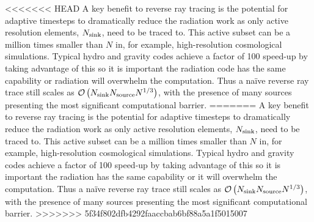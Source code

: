 \documentclass[fleq,usenatbib]{mnras}
\newcommand{\bigO}[1]{\mathcal{O}\left(#1\right)}
\newcommand{\NS}{N_{\rm source}}
\newcommand{\NK}{N_{\rm sink}}
\begin{document}
<<<<<<< HEAD
A key benefit to reverse ray tracing is the potential for adaptive timesteps 
to dramatically reduce the radiation work as only active resolution elements, 
$\NK$, need to be traced to. This active subset can be a million times smaller 
than $N$ in, for example, high-resolution cosmological simulations. Typical 
hydro and gravity codes achieve a factor of 100 speed-up by taking advantage 
of this so it is important the radiation code has the same capability or 
radiation will overwhelm the computation. Thus a na\"ive reverse ray trace 
still scales as $\bigO{\NK \NS N^{1/3}}$, with the presence of many sources 
presenting the most significant computational barrier.
=======
A key benefit to reverse ray tracing is the potential for adaptive timesteps to dramatically 
reduce the radiation work as only active resolution elements, $\NK$, need 
to be traced to. This active subset can be a million times smaller than 
$N$ in, for example, high-resolution cosmological simulations.
Typical hydro and gravity codes achieve a factor of 100 speed-up by taking advantage of this
so it is important the radiation has the same capability or it will overwhelm the computation.
Thus a na\"ive reverse 
ray trace still scales as $\bigO{\NK \NS N^{1/3}}$, with the presence of many 
sources presenting the most significant computational barrier.
>>>>>>> 5f34f802dfb4292faaccbab6bf88a5a1f5015007
\end{document}
